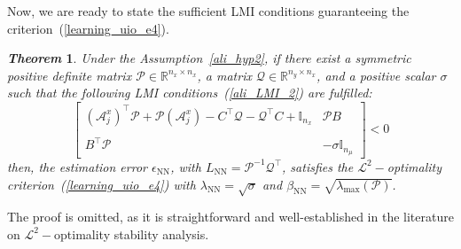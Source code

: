 \documentclass{ifacconf}
\def\eqref#1{(\ref{#1})}
\def\nn{\mathrm{NN}}
\def\Lo{L}
\newtheorem{theorem}{\it \textbf{Theorem}}%
\begin{document}
Now, we are ready to state the sufficient LMI conditions guaranteeing the criterion~\eqref{learning_uio_e4}.

\begin{theorem}\label{ali_thm2}
Under the Assumption~\ref{ali_hyp2}, if there exist a symmetric positive definite matrix $\mathcal{P} \in \mathbb{R}^{n_{x}\times n_{x}}$, a matrix $\mathcal{Q} \in \mathbb{R}^{n_{y}\times n_{x}}$, and a positive scalar $\sigma$ such that the following LMI conditions~\eqref{ali_LMI_2} are fulfilled:
\begin{equation}\label{ali_LMI_2}
\begin{bmatrix}
\left(\mathcal{A}^{x}_{j}\right)^{\top} \mathcal{P} + \mathcal{P} \left( \mathcal{A}^{x}_{j} \right)  - C^{\top} \mathcal{Q}  - \mathcal{Q}^{\top}  C + \mathbb{I}_{n_x}
&
\mathcal{P} B
\\~\\
B^{\top} \mathcal{P} &
- \sigma \mathbb{I}_{n_{\mu}}
\end{bmatrix} 
< 0
\end{equation}
then, the estimation error $\epsilon_{\nn}$, with $\Lo_{\nn} = \mathcal{P}^{-1} \mathcal{Q}^{\top}$, satisfies the $\mathcal{L}^{2}-$optimality criterion~\eqref{learning_uio_e4} with $\lambda_{\nn}=\sqrt{\sigma}$ and $\beta_{\nn} = \sqrt{\lambda_{\max} (\mathcal{P})}$.
\end{theorem}
\begin{pf}
The proof is omitted, as it is straightforward and well-established in the literature on $\mathcal{L}^{2}-$optimality stability analysis.
\end{pf}



\vspace*{-0.3cm}
\end{document}
